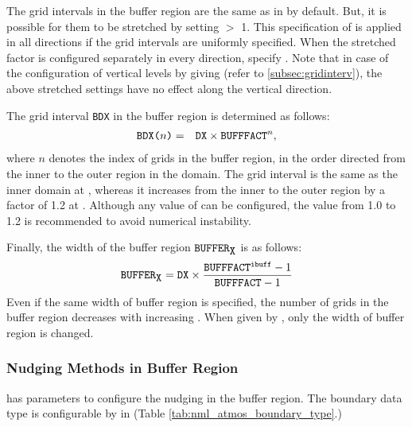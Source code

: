The grid intervals in the buffer region are the same as  in  by default.
But, it is possible for them to be stretched by setting  $>$ 1. This specification of  is applied in all directions if the grid intervals are uniformly specified. When the stretched factor is configured separately in every direction, specify . Note that in case of the configuration of vertical levels by giving  (refer to \ref{subsec:gridinterv}), the above stretched settings have no effect along the vertical direction.

The grid interval \verb|BDX| in the buffer region is determined as follows:
\begin{eqnarray}
 \verb|BDX(|n\verb|)| &=& \verb|DX| \times \verb|BUFFFACT|^n, \nonumber
\end{eqnarray}
where $n$ denotes the index of grids in the buffer region, in the order directed from the inner to the outer region in the domain. The grid interval is the same as the inner domain at , whereas it increases from the inner to the outer region by a factor of 1.2 at .  Although any value of  can be configured, the value from 1.0 to 1.2 is recommended to avoid numerical instability.

Finally, the width of the buffer region $\verb|BUFFER|_{\verb|X|}$ is as follows:
\begin{eqnarray}
  \verb|BUFFER|_{\verb|X|} = \nmitemeq{DX} \times \frac{ \nmitemeq{BUFFFACT}^{\texttt{\detokenize{ibuff}}}-1}{ \nmitemeq{BUFFFACT}-1 }
\end{eqnarray}
Even if the same width of buffer region  is specified, the number of grids in the buffer region decreases with increasing .
When given by , only the width of buffer region is changed.



\subsubsection{Nudging Methods in Buffer Region}

 has parameters to configure the nudging in the buffer region.
The boundary data type is configurable by  in  (Table \ref{tab:nml_atmos_boundary_type}.)

